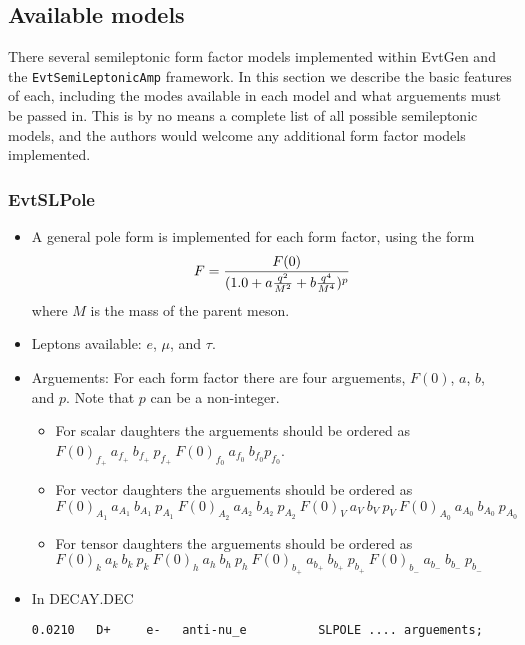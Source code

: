 \subsection{Available models}
\label{sec:models}
\noindent There several semileptonic form factor models
implemented within EvtGen and the {\tt EvtSemiLeptonicAmp} 
framework.  In this section we describe the basic features of
each, including the modes available in each model and what
arguements must be passed in.  This is by no means a complete
list of all possible semileptonic models, and the authors would
welcome any additional form factor models implemented.

\subsubsection{EvtSLPole}
\label{sect:EvtSLPole}
\begin{itemize} 
\item A general pole form is implemented for each form factor, using
the form
\begin{equation}
F = { {F(0)} \over { (1.0 + a { {q^2} \over {M^2} } + b { {q^4} \over {M^4} })^p}}
\end{equation}
where $M$ is the mass of the parent meson. 
\item Leptons available: $e$, $\mu$, and $\tau$.
\item Arguements: For each form factor there are four arguements, $F(0)$,
$a$, $b$, and $p$.  Note that $p$ can be a non-integer.  
\begin{itemize}
\item For scalar daughters the arguements should be ordered
as \\
$F(0)_{f_+}~ a_{f_+}~ b_{f_+}~ p_{f_+}~ F(0)_{f_0}~ a_{f_0}~ b_{f_0}p_{f_0}$.
\item For vector daughters the arguements should be ordered
as \\
$F(0)_{A_1}~ a_{A_1}~ b_{A_1}~p_{A_1}~F(0)_{A_2}~ a_{A_2}~ b_{A_2}~p_{A_2}~
F(0)_{V}~ a_{V}~ b_{V}~ p_{V}~
F(0)_{A_0}~ a_{A_0}~ b_{A_0}~p_{A_0}$
\item For tensor daughters the arguements should be ordered
as  \\ 
$F(0)_{k}~ a_{k}~ b_{k}~p_{k}~F(0)_{h}~ a_{h}~ b_{h}~p_{h}~F(0)_{b_+}~ a_{b_+}~ b_{b_+}~
p_{b_+}~F(0)_{b_-}~ a_{b_-}~ b_{b_-}~p_{b_-}$
\end{itemize}
\item In DECAY.DEC
\begin{verbatim}
0.0210   D+     e-   anti-nu_e          SLPOLE .... arguements;
\end{verbatim}
\end{itemize}

